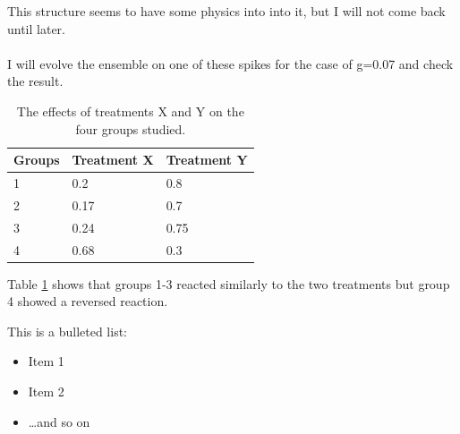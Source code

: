 \documentclass[idxtotoc,hyperref,openany]{labbook} %
\begin{document}
This structure seems to have some physics into into it, but I will not come back until later.
\\
\\
I will evolve the ensemble on one of these spikes for the case of g=0.07 and check the result.





\lipsum[3-5]




\begin{table}[H]
\begin{tabular}{l l l}
\toprule
\textbf{Groups} & \textbf{Treatment X} & \textbf{Treatment Y} \\
\toprule
1 & 0.2 & 0.8\\
2 & 0.17 & 0.7\\
3 & 0.24 & 0.75\\
4 & 0.68 & 0.3\\
\bottomrule
\end{tabular}
\caption{The effects of treatments X and Y on the four groups studied.}
\label{tab:treatments_xy}
\end{table}

Table \ref{tab:treatments_xy} shows that groups 1-3 reacted similarly to the two treatments but group 4 showed a reversed reaction.




This is a bulleted list:

\begin{itemize}
\item Item 1
\item Item 2
\item \ldots and so on
\end{itemize}


\end{document}
